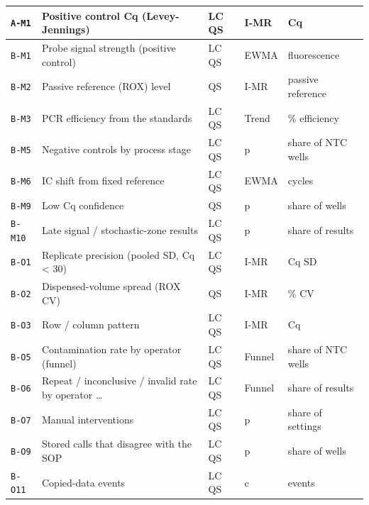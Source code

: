 {\begin{longtable}{@{}lllll@{}}
\texttt{A-M1} & Positive control Cq (Levey-Jennings) & LC QS & I-MR & Cq \\\hline
\texttt{B-M1} & Probe signal strength (positive control) & LC QS & EWMA & fluorescence \\\hline
\texttt{B-M2} & Passive reference (ROX) level & QS & I-MR & passive reference \\\hline
\texttt{B-M3} & PCR efficiency from the standards & LC QS & Trend & \% efficiency \\\hline
\texttt{B-M5} & Negative controls by process stage & LC QS & p & share of NTC wells \\\hline
\texttt{B-M6} & IC shift from fixed reference & LC QS & EWMA & cycles \\\hline
\texttt{B-M9} & Low Cq confidence & QS & p & share of wells \\\hline
\texttt{B-M10} & Late signal / stochastic-zone results & LC QS & p & share of results \\\hline
\texttt{B-O1} & Replicate precision (pooled SD, Cq < 30) & LC QS & I-MR & Cq SD \\\hline
\texttt{B-O2} & Dispensed-volume spread (ROX CV) & QS & I-MR & \% CV \\\hline
\texttt{B-O3} & Row / column pattern & LC QS & I-MR & Cq \\\hline
\texttt{B-O5} & Contamination rate by operator (funnel) & LC QS & Funnel & share of NTC wells \\\hline
\texttt{B-O6} & Repeat / inconclusive / invalid rate by operator … & LC QS & Funnel & share of results \\\hline
\texttt{B-O7} & Manual interventions & LC QS & p & share of settings \\\hline
\texttt{B-O9} & Stored calls that disagree with the SOP & LC QS & p & share of wells \\\hline
\texttt{B-O11} & Copied-data events & LC QS & c & events \\\hline
\bottomrule
\end{longtable}}

